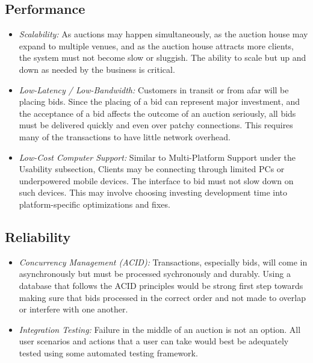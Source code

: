 \documentclass[titlepage, 12pt]{extarticle}
\begin{document}
\subsection{Performance}
\begin{itemize}
\item {\it Scalability:} As auctions may happen simultaneously, as the auction house may expand to multiple venues, and as the auction house attracts more clients, the system must not become slow or sluggish. The ability to scale but up and down as needed by the business is critical.
\item {\it Low-Latency / Low-Bandwidth:} Customers in transit or from afar will be placing bids. Since the placing of a bid can represent major investment, and the acceptance of a bid affects the outcome of an auction seriously, all bids must be delivered quickly and even over patchy connections. This requires many of the transactions to have little network overhead.
\item {\it Low-Cost Computer Support:} Similar to Multi-Platform Support under the Usability subsection, Clients may be connecting through limited PCs or underpowered mobile devices. The interface to bid must not slow down on such devices. This may involve choosing investing development time into platform-specific optimizations and fixes.
\end{itemize}
\subsection{Reliability}
\begin{itemize}
\item {\it Concurrency Management (ACID):} Transactions, especially bids, will come in asynchronously but must be processed sychronously and durably. Using a database that follows the ACID principles would be strong first step towards making sure that bids processed in the correct order and not made to overlap or interfere with one another.
\item {\it Integration Testing:} Failure in the middle of an auction is not an option. All user scenarios and actions that a user can take would best be adequately tested using some automated testing framework.
\end{itemize}
\end{document}
